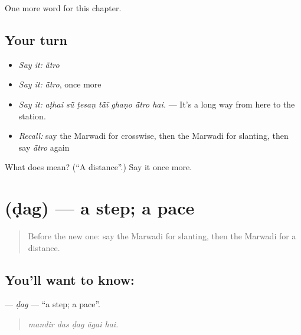 \begin{grammarlens}[title={What you've built}]
One more word for this chapter.
\end{grammarlens}

\subsection*{Your turn}
\begin{itemize}
\raggedright
  \item \emph{Say it:} \emph{ā̃tro}
  \item \emph{Say it:} \emph{ā̃tro}, once more
  \item \emph{Say it:} \emph{aṭhai sū̃ ṭesaṇ tā̃ī ghaṇo ā̃tro hai.} — It's a long way from here to the station.
  \item \emph{Recall:} say the Marwadi for crosswise, then the Marwadi for slanting, then say \emph{ā̃tro} again
\end{itemize}

\begin{tcolorbox}[breakable,colback=teal!4,colframe=teal!35!black,title={Before you move on}]
What does  mean? (\textquotedblleft{}A distance\textquotedblright{}.) Say it once more.
\end{tcolorbox}
\section[\texorpdfstring{\mw{डग} (ḍag)}{डग (ḍag)}]{ (ḍag) — a step; a pace}

\label{lesson:MW-C203-dag}



\begin{quote}
Before the new one: say the Marwadi for slanting, then the Marwadi for a distance.
\end{quote}

\subsection*{You'll want to know: }
\textbf{} — \emph{ḍag} — \textquotedblleft{}a step; a pace\textquotedblright{}.

\begin{quote}
    
\end{quote}

\begin{quote}
\emph{mandir das ḍag āgai hai.}
\end{quote}


